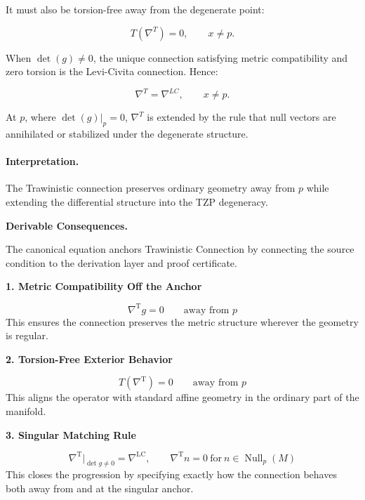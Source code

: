 It must also be torsion-free away from the degenerate point:

\begin{equation}
T(\nabla^{T})=0,
\qquad x\neq p .
\end{equation}

When $\det(g)\neq 0$, the unique connection satisfying metric compatibility and zero torsion is the Levi-Civita connection. Hence:

\begin{equation}
\nabla^{T}=\nabla^{LC},
\qquad x\neq p .
\end{equation}

At $p$, where $\det(g)|_p=0$, $\nabla^{T}$ is extended by the rule that null vectors are annihilated or stabilized under the degenerate structure.

\paragraph{Interpretation.}
The Trawinistic connection preserves ordinary geometry away from $p$ while extending the differential structure into the TZP degeneracy.

\par\vspace{0.35em}
\noindent\textbf{Derivable Consequences.}\quad
\begingroup
\footnotesize
\raggedright
The canonical equation anchors Trawinistic Connection by connecting the source condition to the derivation layer and proof certificate.
\par\endgroup

\noindent\textbf{1. Metric Compatibility Off the Anchor}\par
\[
\nabla^{\mathrm{T}} g = 0
\qquad \text{away from } p
\]
\noindent This ensures the connection preserves the metric structure wherever the geometry is regular.\par
\noindent\textbf{2. Torsion-Free Exterior Behavior}\par
\[
T(\nabla^{\mathrm{T}})=0
\qquad \text{away from } p
\]
\noindent This aligns the operator with standard affine geometry in the ordinary part of the manifold.\par
\noindent\textbf{3. Singular Matching Rule}\par
\[
\nabla^{\mathrm{T}}\big\vert_{\det g \neq 0}
=
\nabla^{\mathrm{LC}},
\qquad
\nabla^{\mathrm{T}} n = 0
\ \text{for}\ n \in \operatorname{Null}_{p}(M)
\]
\noindent This closes the progression by specifying exactly how the connection behaves both away from and at the singular anchor.\par

